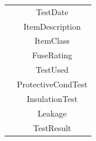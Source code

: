\begin{center}
\begin{tabular}{|c|c|}
                               & TestDate                         \\ 
                               & ItemDescription                  \\ 
                               & ItemClass                        \\ 
                               & FuseRating                       \\ 
                               & TestUsed                         \\ 
                               & ProtectiveCondTest               \\ 
                               & InsulationTest                   \\ 
                               & Leakage                          \\ 
                               & TestResult                       \\ \hline
    \end{tabular}
\end{center}

\newpage

